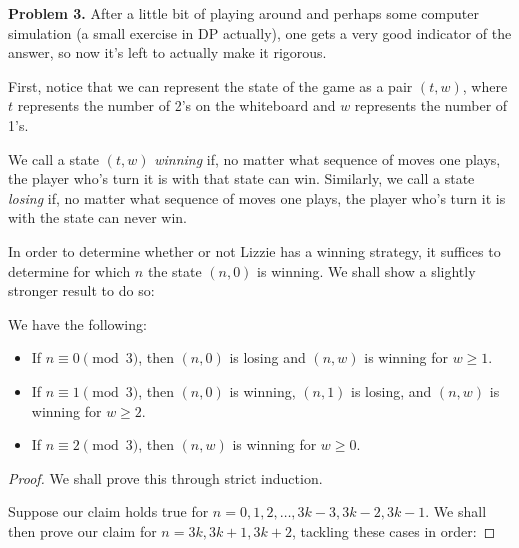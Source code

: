 \begin{solution}{3}
    \textbf{Problem 3.} After a little bit of playing around and perhaps some
    computer simulation (a small exercise in DP actually), one gets a very good
    indicator of the answer, so now it's left to actually make it rigorous.

    First, notice that we can represent the state of the game as a pair \( (t, w) \), where \( t \) represents the number of 2's on the whiteboard and \( w \) represents the number of 1's.

    \begin{definition}
        We call a state \( (t, w) \) \textit{winning} if, no matter what
        sequence of moves one plays, the player who's turn it is with that
        state can win. Similarly, we call a state \textit{losing} if, no matter
        what sequence of moves one plays, the player who's turn it is with the
        state can never win.
    \end{definition}

    In order to determine whether or not Lizzie has a winning strategy, it
    suffices to determine for which \( n \) the state \( (n, 0) \) is winning.
    We shall show a slightly stronger result to do so:

    \begin{claim}
        We have the following:
        \begin{itemize}
            \item If \( n \equiv 0 \pmod{3} \), then \( (n, 0) \) is losing and \( (n, w) \) is winning for \( w \ge 1 \).
            \item If \( n \equiv 1 \pmod{3} \), then \( (n, 0) \) is winning, \( (n, 1) \) is losing, and \( (n, w) \) is winning for \( w \ge 2 \).
            \item If \( n \equiv 2 \pmod{3} \), then \( (n, w) \) is winning for \( w \ge 0 \).
        \end{itemize}
    \end{claim}

    \begin{proof}
        We shall prove this through strict induction.

        Suppose our claim holds true for \( n = 0, 1, 2, \ldots, 3k - 3, 3k - 2, 3k - 1 \). We shall then prove our claim for \( n = 3k, 3k + 1, 3k + 2 \), tackling these cases in order:


\end{proof}
\end{solution}
